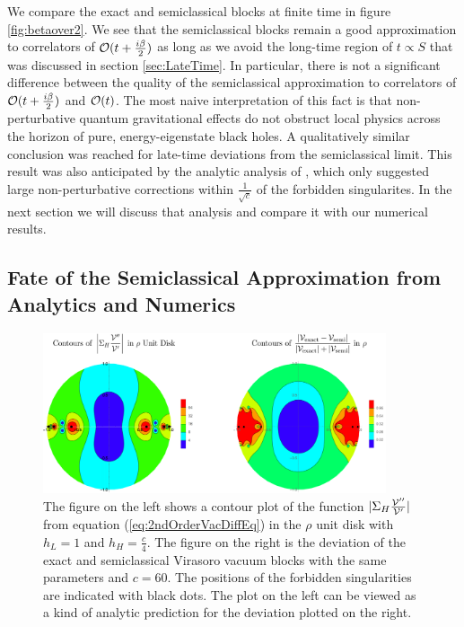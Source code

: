 We compare the exact and semiclassical blocks at finite time in figure \ref{fig:betaover2}.   We see that the semiclassical blocks remain a good approximation to correlators of ${\cal O}(t + \frac{i \beta}{2})$ as long as we avoid the long-time region of $t \propto S$ that was discussed in section \ref{sec:LateTime}.  In particular,  there is not a significant difference between the quality of the semiclassical approximation to correlators of ${\cal O}(t + \frac{i \beta}{2})$ and ${\cal O}(t)$.  The most naive interpretation of this fact is that non-perturbative quantum gravitational effects do not obstruct local physics across the horizon of pure, energy-eigenstate black holes.  A qualitatively similar conclusion was reached for late-time deviations \cite{Kabat:2014kfa} from the semiclassical limit.  This result was also anticipated by the analytic analysis of \cite{Fitzpatrick:2016ive}, which only suggested large non-perturbative corrections within $\frac{1}{\sqrt{c}}$ of the forbidden singularites.  In the next section we will discuss that analysis and compare it with our numerical results.


\subsection{Fate of the Semiclassical Approximation from Analytics and Numerics}
\label{sec:FateSemiclassical}

\begin{figure}[t]
\centering{}\includegraphics[width=0.9\textwidth]{virasoro_chapter/ContoursSigmaFunction}
\caption[Contour plots in the $q$ disk of deviations from semiclassical predictions]{The figure on the left shows a contour plot of the function $|\Sigma_{H} \frac{{\cal V}''}{{\cal V}'}|$ from equation (\ref{eq:2ndOrderVacDiffEq}) in the $\rho$ unit disk with $h_L = 1$ and $h_H = \frac{c}{4}$.  The figure on the right is the deviation of the exact and semiclassical Virasoro vacuum blocks with the same parameters and $c = 60$.  The positions of the forbidden singularities are indicated with black dots. The plot on the left can be viewed as a kind of analytic prediction for the deviation plotted on the right. }
\label{fig:ContoursSigmaFunction}
\end{figure}

